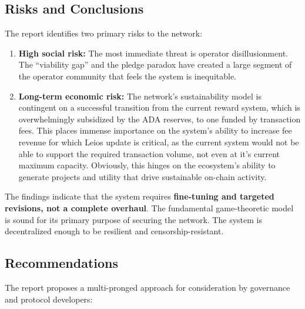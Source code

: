 \documentclass[11pt, letterpaper]{article}
\begin{document}
\subsection*{Risks and Conclusions}

The report identifies two primary risks to the network:

\begin{enumerate}
    \item \textbf{High social risk:} The most immediate threat is operator disillusionment. The ``viability gap'' 
    and the pledge paradox have created a large segment of the operator community that feels the 
    system is inequitable.
    
    \item \textbf{Long-term economic risk:} The network's sustainability model is contingent on a successful 
    transition from the current reward system, which is overwhelmingly subsidized by the ADA reserves,
    to one funded by transaction fees. This places immense importance on the system's ability to increase fee revenue
	for which Leios update is critical, as the current system would not be able to support the required 
	transaction volume, not even at it's current maximum capacity. Obviously, this hinges on the ecosystem's 
	ability to generate projects and utility that drive sustainable on-chain activity.

\end{enumerate}

The findings indicate that the system requires \textbf{fine-tuning and targeted revisions, not a complete overhaul}. The fundamental 
game-theoretic model is sound for its primary purpose of securing the network. The system is decentralized enough to be resilient 
and censorship-resistant. 

\subsection*{Recommendations}

The report proposes a multi-pronged approach for consideration by governance and protocol developers:
\end{document}
